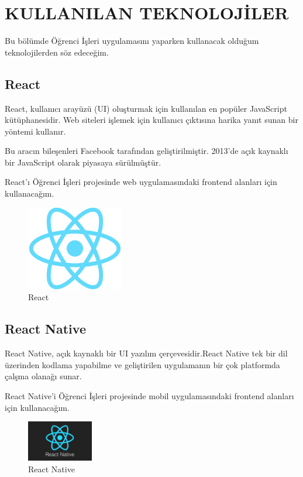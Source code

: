 \chapter{KULLANILAN TEKNOLOJİLER}\label{ch:fp}
\vspace*{-1cm}
Bu bölümde Öğrenci İşleri uygulamasını yaparken kullanacak olduğum teknolojilerden söz edeceğim.

\section{React}
React, kullanıcı arayüzü (UI) oluşturmak için kullanılan en popüler JavaScript kütüphanesidir. Web siteleri işlemek için kullanıcı çıktısına harika yanıt sunan bir yöntemi kullanır.

Bu aracın bileşenleri Facebook tarafından geliştirilmiştir. 2013’de açık kaynaklı bir JavaScript olarak piyasaya sürülmüştür.

React'ı Öğrenci İşleri projesinde web uygulamasındaki frontend alanları için kullanacağım.

\begin{figure} [h]
 \centering
 \includegraphics[width=120pt,keepaspectratio=true]{./fig/React}
  \caption{React}
 \label{fig:ch3-1}
\end{figure}

\section{React Native}

React Native, açık kaynaklı bir UI yazılım çerçevesidir.React Native tek bir dil üzerinden kodlama yapabilme ve geliştirilen uygulamanın bir çok platformda çalşma olanağı sunar.

React Native'i Öğrenci İşleri projesinde mobil uygulamasındaki frontend alanları için kullanacağım.

\begin{figure} [h]
 \centering
 \includegraphics[width=82pt,keepaspectratio=true]{./fig/react-native}
  \caption{React Native}
 \label{fig:ch3-2}
\end{figure}


